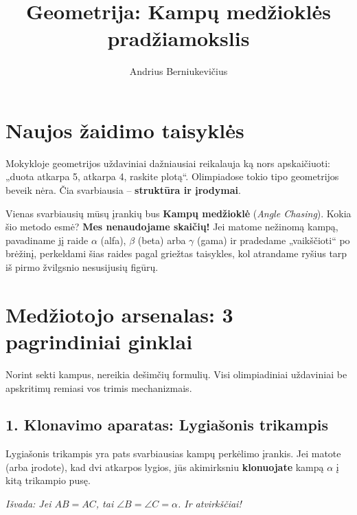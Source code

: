 \documentclass[11pt,a4paper]{scrartcl}
\title{Geometrija: Kampų medžioklės pradžiamokslis}
\author{Andrius Berniukevičius}
\begin{document}
\maketitle

\section{Naujos žaidimo taisyklės}

Mokykloje geometrijos uždaviniai dažniausiai reikalauja ką nors apskaičiuoti: „duota atkarpa 5, atkarpa 4, raskite plotą“. Olimpiadose tokio tipo geometrijos beveik nėra. Čia svarbiausia – \textbf{struktūra ir įrodymai}.

Vienas svarbiausių mūsų įrankių bus \textbf{Kampų medžioklė} (\textit{Angle Chasing}). 
Kokia šio metodo esmė? \textbf{Mes nenaudojame skaičių!} Jei matome nežinomą kampą, pavadiname jį raide $\alpha$ (alfa), $\beta$ (beta) arba $\gamma$ (gama) ir pradedame „vaikščioti“ po brėžinį, perkeldami šias raides pagal griežtas taisykles, kol atrandame ryšius tarp iš pirmo žvilgsnio nesusijusių figūrų.

\section{Medžiotojo arsenalas: 3 pagrindiniai ginklai}

Norint sekti kampus, nereikia dešimčių formulių. Visi olimpiadiniai uždaviniai be apskritimų remiasi vos trimis mechanizmais.

\subsection*{1. Klonavimo aparatas: Lygiašonis trikampis}
Lygiašonis trikampis yra pats svarbiausias kampų perkėlimo įrankis. Jei matote (arba įrodote), kad dvi atkarpos lygios, jūs akimirksniu \textbf{klonuojate} kampą $\alpha$ į kitą trikampio pusę.
\begin{center}
\end{center}
\textit{Išvada: Jei $AB = AC$, tai $\angle B = \angle C = \alpha$. Ir atvirkščiai!}
\end{document}
